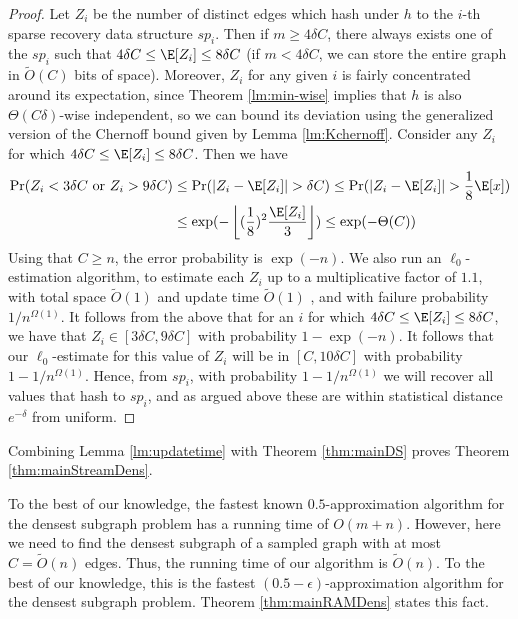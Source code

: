 \begin{proof}
Let $Z_i$ be the number of distinct edges which hash under $h$ to the $i$-th sparse recovery
data structure $sp_i$. Then if $m \geq 4\delta C$, there always exists one of the $sp_i$ such that $4\delta C \leq \E[Z_i]\leq 8\delta C$ (if $m < 4\delta C$, we can store the entire graph in $\tilde{O}(C)$ bits of space). Moreover, $Z_i$ for any given $i$ is fairly concentrated around its expectation, since Theorem \ref{lm:min-wise} implies that $h$ is also $\Theta(C \delta)$-wise independent, so we can bound its deviation using the generalized version of the Chernoff bound given by Lemma \ref{lm:Kchernoff}. Consider any $Z_i$ for which $4\delta C \leq \E[Z_i] \leq 8\delta C$. Then we have 
\begin{align*}
\Pr(Z_i< 3\delta C \text{ or }Z_i > 9\delta C) &\leq \Pr(|Z_i-\E[Z_i]|>\delta C)  
\leq \Pr(|Z_i-\E[Z_i]|> \frac 1 8 \E[x])\\
& \leq \exp(-\left \lfloor (\frac 1 8)^2 \frac {\E[Z_i]} 3 \right \rfloor) \leq  \exp(-\Theta(C)) 
\end{align*}
Using that $C \geq n$, the error probability is $\exp(-n)$. We also run an $\ell_0$-estimation algorithm, to estimate
each $Z_i$ up to a multiplicative factor of $1.1$, with total space $\tilde{O}(1)$ and update time $\tilde{O}(1)$ \cite{cdim03}, 
and with failure probability $1/n^{\Omega(1)}$. It follows
from the above that for an $i$ for which $4\delta C \leq \E[Z_i] \leq 8\delta C$, we have that $Z_i \in [3\delta C, 9 \delta C]$ with
probability $1-\exp(-n)$. It follows that our $\ell_0$-estimate for this value of $Z_i$ will be in $[C, 10\delta C]$ with
probability $1-1/n^{\Omega(1)}$. Hence, from $sp_i$, with probability $1-1/n^{\Omega(1)}$ we will recover all values that hash to $sp_i$,
and as argued above these are within statistical distance $e^{-\delta}$ from uniform.
\end{proof}

Combining Lemma \ref{lm:updatetime} with Theorem \ref{thm:mainDS} proves Theorem \ref{thm:mainStreamDens}.


To the best of our knowledge, the fastest known $0.5$-approximation algorithm for the densest subgraph problem has a running time of $O(m+n)$. However, here we need to find the densest subgraph of a sampled graph with at most $C=\tilde{O}(n)$ edges. Thus, the running time of our algorithm is $\tilde{O}(n)$. To the best of our knowledge, this is the fastest $(0.5-\epsilon)$-approximation algorithm for the densest subgraph problem.
Theorem \ref{thm:mainRAMDens} states this fact.
